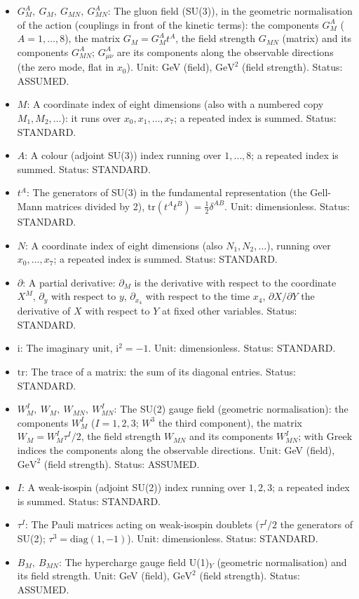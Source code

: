 \documentclass[
  10pt,
]{article}
\providecommand{\tightlist}{%
  \setlength{\itemsep}{0pt}\setlength{\parskip}{0pt}}
\begin{document}
\begin{itemize}
\tightlist
\item
  \(G^A_M,\ G_M,\ G_{MN},\ G^A_{MN}\): The gluon field (SU(3)), in the
  geometric normalisation of the action (couplings in front of the
  kinetic terms): the components \(G^A_M\) (\(A = 1, \dots, 8\)), the
  matrix \(G_M = G^A_Mt^A\), the field strength \(G_{MN}\) (matrix) and
  its components \(G^A_{MN}\); \(G^A_{\mu\nu}\) are its components along
  the observable directions (the zero mode, flat in \(x_0\)). Unit: GeV
  (field), \(\mathrm{GeV}^{2}\) (field strength). Status: ASSUMED.
\item
  \(M\): A coordinate index of eight dimensions (also with a numbered
  copy \(M_1, M_2, \dots\)): it runs over \(x_0, x_1, \dots, x_7\); a
  repeated index is summed. Status: STANDARD.
\item
  \(A\): A colour (adjoint SU(3)) index running over \(1, \dots, 8\); a
  repeated index is summed. Status: STANDARD.
\item
  \(t^A\): The generators of SU(3) in the fundamental representation
  (the Gell-Mann matrices divided by 2),
  \(\mathrm{tr}(t^At^B) = \frac12\delta^{AB}\). Unit: dimensionless.
  Status: STANDARD.
\item
  \(N\): A coordinate index of eight dimensions (also
  \(N_1, N_2, \dots\)), running over \(x_0, \dots, x_7\); a repeated
  index is summed. Status: STANDARD.
\item
  \(\partial\): A partial derivative: \(\partial_M\) is the derivative
  with respect to the coordinate \(X^M\), \(\partial_y\) with respect to
  \(y\), \(\partial_{x_4}\) with respect to the time \(x_4\),
  \(\partial X/\partial Y\) the derivative of \(X\) with respect to
  \(Y\) at fixed other variables. Status: STANDARD.
\item
  \(\mathrm{i}\): The imaginary unit, \(\mathrm{i}^2 = -1\). Unit:
  dimensionless. Status: STANDARD.
\item
  \(\mathrm{tr}\): The trace of a matrix: the sum of its diagonal
  entries. Status: STANDARD.
\item
  \(W^I_M,\ W_M,\ W_{MN},\ W^I_{MN}\): The SU(2) gauge field (geometric
  normalisation): the components \(W^I_M\) (\(I = 1, 2, 3\); \(W^3\) the
  third component), the matrix \(W_M = W^I_M\tau^I/2\), the field
  strength \(W_{MN}\) and its components \(W^I_{MN}\); with Greek
  indices the components along the observable directions. Unit: GeV
  (field), \(\mathrm{GeV}^{2}\) (field strength). Status: ASSUMED.
\item
  \(I\): A weak-isospin (adjoint SU(2)) index running over \(1, 2, 3\);
  a repeated index is summed. Status: STANDARD.
\item
  \(\tau^I\): The Pauli matrices acting on weak-isospin doublets
  (\(\tau^I/2\) the generators of SU(2);
  \(\tau^3 = \mathrm{diag}(1, -1)\)). Unit: dimensionless. Status:
  STANDARD.
\item
  \(B_M,\ B_{MN}\): The hypercharge gauge field U(1)\(_Y\) (geometric
  normalisation) and its field strength. Unit: GeV (field),
  \(\mathrm{GeV}^{2}\) (field strength). Status: ASSUMED.
\end{itemize}
\end{document}
